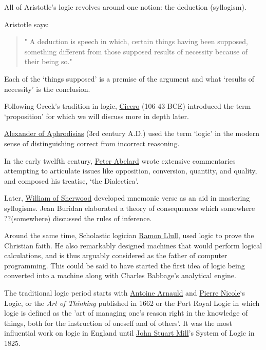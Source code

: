 \documentclass[]{book}
\theoremstyle{definition}
\theoremstyle{definition}
\theoremstyle{definition}
\theoremstyle{remark}
\begin{document}
All of Aristotle's logic revolves around one notion: the deduction
(syllogism).

Aristotle says:

\begin{quote}
" A deduction is speech in which, certain things having been supposed,
something different from those supposed results of necessity because of
their being so."
\end{quote}

Each of the `things supposed' is a premise of the argument and what
`results of necessity' is the conclusion.

Following Greek's tradition in logic,
\href{https://en.wikipedia.org/wiki/Cicero}{Cicero} (106-43 BCE)
introduced the term `proposition' for which we will discuss more in
depth later.

\href{https://plato.stanford.edu/entries/alexander-aphrodisias/}{Alexander
of Aphrodisias} (3rd century A.D.) used the term `logic' in the modern
sense of distinguishing correct from incorrect reasoning.

In the early twelfth century,
\href{https://en.wikipedia.org/wiki/Peter_Abelard}{Peter Abelard} wrote
extensive commentaries attempting to articulate issues like opposition,
conversion, quantity, and quality, and composed his treatise, `the
Dialectica'.

Later, \href{https://en.wikipedia.org/wiki/William_of_Sherwood}{William
of Sherwood} developed mnemonic verse as an aid in mastering syllogisms.
Jean Buridan elaborated a theory of consequences which somewhere
??(somewhere) discussed the rules of inference.

Around the same time, Scholastic logician
\href{https://en.wikipedia.org/wiki/Ramon_Llull}{Ramon Llull}, used
logic to prove the Christian faith. He also remarkably designed machines
that would perform logical calculations, and is thus arguably considered
as the father of computer programming. This could be said to have
started the first idea of logic being converted into a machine along
with Charles Babbage's analytical engine.

The traditional logic period starts with
\href{https://en.wikipedia.org/wiki/Antoine_Arnauld}{Antoine Arnauld}
and \href{https://en.wikipedia.org/wiki/Pierre_Nicole}{Pierre Nicole}`s
Logic, or the \emph{Art of Thinking} published in 1662 or the Port Royal
Logic in which logic is defined as the 'art of managing one's reason
right in the knowledge of things, both for the instruction of oneself
and of others'. It was the most influential work on logic in England
until \href{https://en.wikipedia.org/wiki/John_Stuart_Mill}{John Stuart
Mill}'s System of Logic in 1825.
\end{document}
